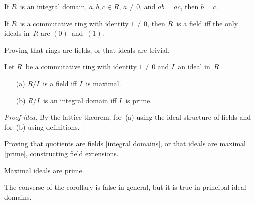 \begin{thm}
If \(R\)~is an integral domain, \(a,b,c\in R\), \(a\ne0\), and \(ab=ac\), then \(b=c\).
\end{thm}

\begin{thm}
If \(R\)~is a commutative ring with identity \(1\ne0\), then \(R\)~is a field iff the only ideals in~\(R\) are \((0)\)~and~\((1)\).
\end{thm}
\begin{app}
Proving that rings are fields, or that ideals are trivial.
\end{app}

\begin{thm}[Quotients]
Let \(R\)~be a commutative ring with identity \(1\ne0\) and \(I\)~an ideal in~\(R\).
\begin{enumerate}[itemsep=0pt]
\item[(a)] \(R/I\)~is a field iff \(I\)~is maximal.
\item[(b)] \(R/I\)~is an integral domain iff \(I\)~is prime.
\end{enumerate}
\end{thm}
\begin{proof}[Proof idea]
By the lattice theorem, for~(a) using the ideal structure of fields and for~(b) using definitions.
\end{proof}
\begin{app}
Proving that quotients are fields [integral domains], or that ideals are maximal [prime], constructing field extensions.
\end{app}

\begin{cor}
Maximal ideals are prime.
\end{cor}
\begin{rmk}
The converse of the corollary is false in general, but it is true in principal ideal domains.
\end{rmk}

